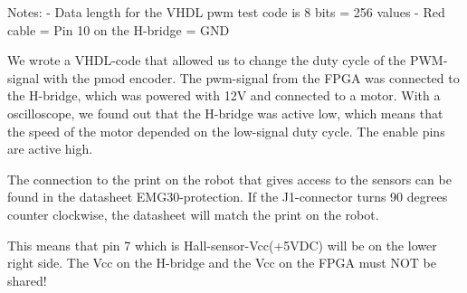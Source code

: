 Notes:
- Data length for the VHDL pwm test code is 8 bits = 256 values
- Red cable = Pin 10 on the H-bridge = GND

We wrote a VHDL-code that allowed us to change the duty cycle of the PWM-signal with the pmod encoder. The pwm-signal from the FPGA was connected to the H-bridge, which was powered with 12V and connected to a motor.
With a oscilloscope, we found out that the H-bridge was active low, which means that the speed of the motor depended on the low-signal duty cycle.
The enable pins are active high.

The connection to the print on the robot that gives access to the sensors can be found in the datasheet EMG30-protection. If the J1-connector turns 90 degrees counter clockwise, the datasheet will match the print on the robot.

This means that pin 7 which is Hall-sensor-Vcc(+5VDC) will be on the lower right side.
The Vcc on the H-bridge and the Vcc on the FPGA must NOT be shared!